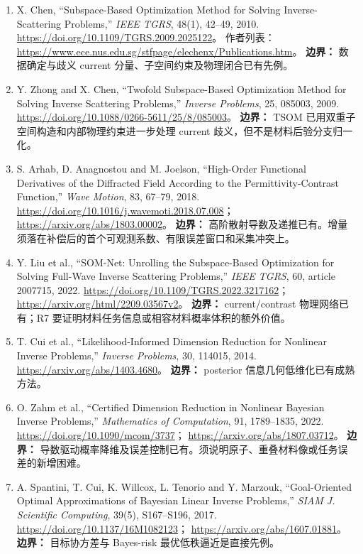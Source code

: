 \begin{enumerate}[label=\textbf{L\arabic*.},leftmargin=3em,itemsep=.7em]
\item X. Chen, “Subspace-Based Optimization Method for Solving Inverse-Scattering Problems,” \emph{IEEE TGRS}, 48(1), 42--49, 2010.
\url{https://doi.org/10.1109/TGRS.2009.2025122}。
作者列表：\url{https://www.ece.nus.edu.sg/stfpage/elechenx/Publications.htm}。
\textbf{边界：} 数据确定与歧义 current 分量、子空间约束及物理闭合已有先例。

\item Y. Zhong and X. Chen, “Twofold Subspace-Based Optimization Method for Solving Inverse Scattering Problems,” \emph{Inverse Problems}, 25, 085003, 2009.
\url{https://doi.org/10.1088/0266-5611/25/8/085003}。
\textbf{边界：} TSOM 已用双重子空间构造和内部物理约束进一步处理 current 歧义，但不是材料后验分支归一化。

\item S. Arhab, D. Anagnostou and M. Joelson, “High-Order Functional Derivatives of the Diffracted Field According to the Permittivity-Contrast Function,” \emph{Wave Motion}, 83, 67--79, 2018.
\url{https://doi.org/10.1016/j.wavemoti.2018.07.008}；
\url{https://arxiv.org/abs/1803.00002}。
\textbf{边界：} 高阶散射导数及递推已有。增量须落在补偿后的首个可观测系数、有限误差窗口和采集冲突上。

\item Y. Liu et al., “SOM-Net: Unrolling the Subspace-Based Optimization for Solving Full-Wave Inverse Scattering Problems,” \emph{IEEE TGRS}, 60, article 2007715, 2022.
\url{https://doi.org/10.1109/TGRS.2022.3217162}；
\url{https://arxiv.org/html/2209.03567v2}。
\textbf{边界：} current/contrast 物理网络已有；R7 要证明材料任务信息或相容材料概率体积的额外价值。

\item T. Cui et al., “Likelihood-Informed Dimension Reduction for Nonlinear Inverse Problems,” \emph{Inverse Problems}, 30, 114015, 2014.
\url{https://arxiv.org/abs/1403.4680}。
\textbf{边界：} posterior 信息几何低维化已有成熟方法。

\item O. Zahm et al., “Certified Dimension Reduction in Nonlinear Bayesian Inverse Problems,” \emph{Mathematics of Computation}, 91, 1789--1835, 2022.
\url{https://doi.org/10.1090/mcom/3737}；
\url{https://arxiv.org/abs/1807.03712}。
\textbf{边界：} 导数驱动概率降维及误差控制已有。须说明原子、重叠材料像或任务误差的新增困难。

\item A. Spantini, T. Cui, K. Willcox, L. Tenorio and Y. Marzouk, “Goal-Oriented Optimal Approximations of Bayesian Linear Inverse Problems,” \emph{SIAM J. Scientific Computing}, 39(5), S167--S196, 2017.
\url{https://doi.org/10.1137/16M1082123}；
\url{https://arxiv.org/abs/1607.01881}。
\textbf{边界：} 目标协方差与 Bayes-risk 最优低秩逼近是直接先例。


\end{enumerate}
